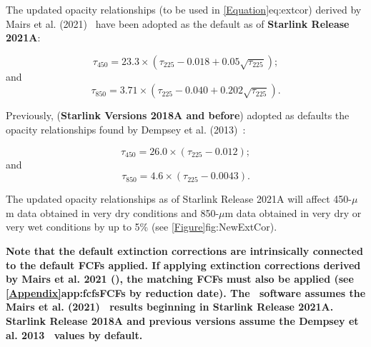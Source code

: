 The updated opacity relationships (to be used in \cref{Equation}{eq:extcor}{})
derived by Mairs et al. (2021)~\cite{mairs21}
have been adopted as the default as of \textbf{Starlink Release 2021A}:

\begin{equation}
\tau_{450} = 23.3 \times (\tau_{225} - 0.018 + 0.05\sqrt{\tau_{225}});
\end{equation}
and
\begin{equation}
\tau_{850} = 3.71 \times (\tau_{225} - 0.040 + 0.202\sqrt{\tau_{225}}).
\end{equation}

Previously, (\textbf{Starlink Versions 2018A and before}) adopted as 
defaults the opacity relationships found by Dempsey et al. (2013)~\cite{dempsey12}:

\begin{equation}
\tau_{450} = 26.0 \times (\tau_{225} - 0.012);
\end{equation}
and
\begin{equation}
\tau_{850} = 4.6 \times (\tau_{225} - 0.0043).
\end{equation}

The updated opacity relationships as of Starlink Release 2021A will affect
450-$\mu$m data obtained in very dry conditions and 850-$\mu$m data
obtained in very dry or very wet conditions by up to 5\% (see \cref{Figure}{fig:NewExtCor}{}).

\textbf{Note that the default extinction corrections are intrinsically connected to the default FCFs
applied. If applying extinction corrections derived by Mairs et al. 2021 (\cite{mairs21}), the matching
FCFs must also be applied (see \cref{Appendix}{app:fcfs}{FCFs by reduction date}).
The \oracdr\ software assumes the Mairs et al. (2021)~\cite{mairs21}
results beginning in Starlink Release 2021A. Starlink Release 2018A and previous
versions assume the Dempsey et al. 2013~\cite{dempsey12} values by default.}

